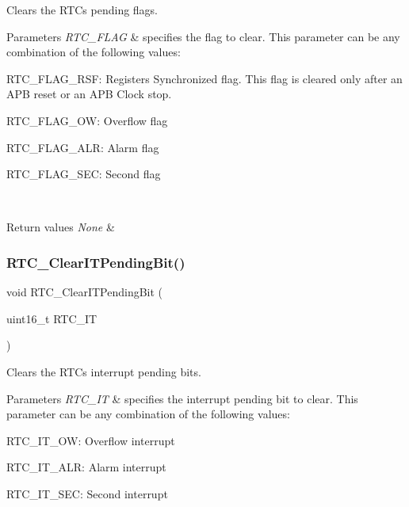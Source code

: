 Clears the R\+TC\textquotesingle{}s pending flags. 


\begin{DoxyParams}{Parameters}
{\em R\+T\+C\+\_\+\+F\+L\+AG} & specifies the flag to clear. This parameter can be any combination of the following values\+: \begin{DoxyItemize}
\item R\+T\+C\+\_\+\+F\+L\+A\+G\+\_\+\+R\+SF\+: Registers Synchronized flag. This flag is cleared only after an A\+PB reset or an A\+PB Clock stop. \item R\+T\+C\+\_\+\+F\+L\+A\+G\+\_\+\+OW\+: Overflow flag \item R\+T\+C\+\_\+\+F\+L\+A\+G\+\_\+\+A\+LR\+: Alarm flag \item R\+T\+C\+\_\+\+F\+L\+A\+G\+\_\+\+S\+EC\+: Second flag \end{DoxyItemize}
\\
\hline
\end{DoxyParams}

\begin{DoxyRetVals}{Return values}
{\em None} & \\
\hline
\end{DoxyRetVals}
\mbox{\label{group___r_t_c___exported___functions_ga62b9a04d89a11f28db7dcfd50d9ee768}} 
\subsubsection{\texorpdfstring{RTC\_ClearITPendingBit()}{RTC\_ClearITPendingBit()}}
{\footnotesize\ttfamily void R\+T\+C\+\_\+\+Clear\+I\+T\+Pending\+Bit (\begin{DoxyParamCaption}\item[{uint16\+\_\+t}]{R\+T\+C\+\_\+\+IT }\end{DoxyParamCaption})}



Clears the R\+TC\textquotesingle{}s interrupt pending bits. 


\begin{DoxyParams}{Parameters}
{\em R\+T\+C\+\_\+\+IT} & specifies the interrupt pending bit to clear. This parameter can be any combination of the following values\+: \begin{DoxyItemize}
\item R\+T\+C\+\_\+\+I\+T\+\_\+\+OW\+: Overflow interrupt \item R\+T\+C\+\_\+\+I\+T\+\_\+\+A\+LR\+: Alarm interrupt \item R\+T\+C\+\_\+\+I\+T\+\_\+\+S\+EC\+: Second interrupt \end{DoxyItemize}
\\
\hline
\end{DoxyParams}

